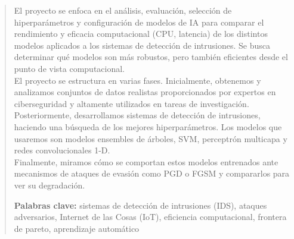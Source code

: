 \documentclass[12pt,a4paper,twoside,openright]{book}
\begin{document}


\frontmatter

\renewcommand{\abstractname}{Resumen}

\begin{abstract}

El proyecto se enfoca en el análisis, evaluación, selección de hiperparámetros y configuración de modelos de IA para comparar el rendimiento y eficacia computacional (CPU, latencia) de los distintos modelos aplicados a los sistemas de detección de intrusiones. 
Se busca determinar qué modelos son más robustos, pero también eficientes desde el punto de vista computacional. \\

El proyecto se estructura en varias fases. Inicialmente, obtenemos y analizamos conjuntos de datos realistas proporcionados por expertos en ciberseguridad y altamente utilizados en tareas de investigación.
Posteriormente, desarrollamos sistemas de detección de intrusiones, haciendo una búsqueda de los mejores hiperparámetros. Los modelos que usaremos son modelos ensembles de árboles, SVM, perceptrón multicapa y redes convolucionales 1-D. \\

Finalmente, miramos cómo se comportan estos modelos entrenados ante mecanismos de ataques de evasión como PGD o FGSM y compararlos para ver su degradación.


\medskip
\noindent\textbf{Palabras clave:} 
sistemas de detección de intrusiones (IDS), ataques adversarios, Internet de las Cosas (IoT), eficiencia computacional, frontera de pareto, aprendizaje automático 
\end{abstract}
\end{document}
